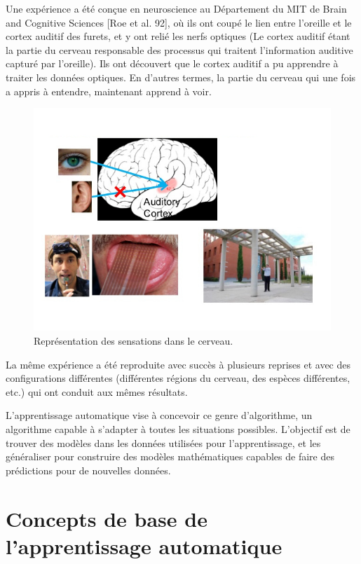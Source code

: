 	Une expérience a été conçue en neuroscience au Département du MIT de Brain and Cognitive Sciences [Roe et al. 92], où ils ont coupé le lien entre l'oreille et le cortex auditif des furets, et y ont relié les nerfs optiques (Le cortex auditif étant la partie du cerveau responsable des processus qui traitent l'information auditive capturé par l'oreille). Ils ont découvert que le cortex auditif a pu apprendre à traiter les données optiques. En d'autres termes, la partie du cerveau qui une fois a appris à entendre, maintenant apprend à voir.

\begin{figure}[H]
	\centering
		\includegraphics[width=5in]{Figures/OneLearningAlgoAndreNg.jpg}
	\caption[An Electron]{Représentation des sensations dans le cerveau.}
	\label{fig:Electron}
\end{figure}


	La même expérience a été reproduite avec succès à plusieurs reprises et avec des configurations différentes (différentes régions du cerveau, des espèces différentes, etc.) qui ont conduit aux mêmes résultats.

	L'apprentissage automatique vise à concevoir ce genre d'algorithme, un algorithme capable à s'adapter à toutes les situations possibles. L'objectif est de trouver des modèles dans les données utilisées pour l'apprentissage, et les généraliser pour construire des modèles mathématiques capables de faire des prédictions pour de nouvelles données.

\section{Concepts de base de l'apprentissage automatique}

